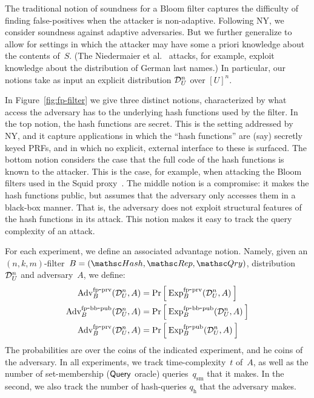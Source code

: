   
The traditional notion of soundness for a Bloom filter captures the difficulty of finding false-positives when the attacker is non-adaptive.  Following NY, we consider soundness against adaptive adversaries.  But we further generalize to allow for settings in which the attacker may have some a priori knowledge about the contents of~$S$. (The Niedermaier et al.~\cite{xxx} attacks, for example, exploit knowledge about the distribution of German last names.)   In particular, our notions take as input an explicit distribution $\mathcal{D}_{U}^{n}$ over $[U]^n$.   

In Figure~\ref{fig:fp-filter} we give three distinct notions, characterized by what access the adversary has to the underlying hash functions used by the filter.  In the top notion, the hash functions are secret.  This is the setting addressed by NY, and it capture applications in which the ``hash functions'' are (say) secretly keyed PRFs, and in which no explicit, external interface to these is surfaced.  
%
The bottom notion considers the case that the full code of the hash functions is known to the attacker.  This is the case, for example, when attacking the Bloom filters used in the Squid proxy~\cite{xxx}.
%
The middle notion is a compromise: it makes the hash functions public, but assumes that the adversary only accesses them in a black-box manner.  That is, the adversary does not exploit structural features of the hash functions in its attack.  This notion makes it easy to track the query complexity of an attack. 

For each experiment, we define an associated advantage notion.  Namely, given an $(n,k,m)$-filter~$B=(\Hash,\Rep,\Qry)$, distribution~$\mathcal{D}_{U}^{n}$ and adversary~$A$, we define:
\begin{align*}
\mathrm{Adv}^{\mathrm{fp\mbox{-}prv}}_{B}(\mathcal{D}_{U}^{n},A) &= \Pr\left[\: \mathrm{Exp}^{\mathrm{fp\mbox{-}prv}}_{B}(\mathcal{D}_{U}^{n},A) \:\right] \\
\mathrm{Adv}^{\mathrm{fp\mbox{-}bb\mbox{-}pub}}_{B}(\mathcal{D}_{U}^{n},A) &= \Pr\left[\: \mathrm{Exp}^{\mathrm{fp\mbox{-}bb\mbox{-}pub}}_{B}(\mathcal{D}_{U}^{n},A) \:\right] \\
\mathrm{Adv}^{\mathrm{fp\mbox{-}prv}}_{B}(\mathcal{D}_{U}^{n},A) &= \Pr\left[\: \mathrm{Exp}^{\mathrm{fp\mbox{-}pub}}_{B}(\mathcal{D}_{U}^{n},A) \:\right]
\end{align*}
The probabilities are over the coins of the indicated experiment, and he coins of the adversary.   In all experiments, we track time-complexity~$t$ of~$A$, as well as the number of set-membership ($\mathsf{Query}$ oracle) queries~$q_{\mathrm{sm}}$ that it makes.   In the second, we also track the number of hash-queries $q_{\mathrm{h}}$ that the adversary makes.


